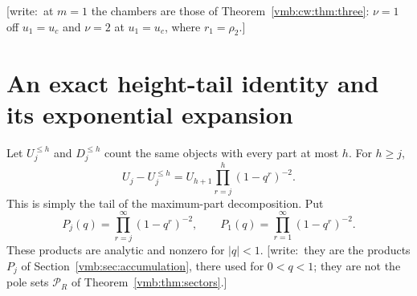 \documentclass[11pt,a4paper]{article}
\numberwithin{equation}{section}
\theoremstyle{definition}\newtheorem{definition}[theorem]{Definition}
\theoremstyle{remark}\newtheorem{remark}[theorem]{Remark}
\newcommand{\calP}{\mathcal P}
\newcommand{\wrt}[1]{\textup{[}\textsf{write:}~#1\textup{]}}
\begin{document}
\wrt{at $m=1$ the chambers are those of Theorem~\ref{vmb:cw:thm:three}:
$\nu=1$ off $u_1=u_c$ and $\nu=2$ at $u_1=u_c$, where $r_1=\rho_2$.}

\section{An exact height-tail identity and its exponential expansion}
\label{vmb:cw:sec:heighttail}
Let $U_j^{\le h}$ and $D_j^{\le h}$ count the same objects with every part
at most $h$. For $h\ge j$,
\begin{equation}\label{vmb:cw:eq:Utail}
 U_j-U_j^{\le h}=U_{h+1}\prod_{r=j}^{h}(1-q^r)^{-2}.
\end{equation}
This is simply the tail of the maximum-part decomposition.
Put
\begin{equation}\label{vmb:cw:eq:Pj}
 P_j(q)=\prod_{r=j}^{\infty}(1-q^r)^{-2},\qquad
 P_1(q)=\prod_{r=1}^{\infty}(1-q^r)^{-2}.
\end{equation}
These products are analytic and nonzero for $|q|<1$. \wrt{they are the
products $P_{j}$ of Section~\ref{vmb:sec:accumulation}, there used for
$0<q<1$; they are not the pole sets $\calP_R$ of
Theorem~\ref{vmb:thm:sectors}.}
\end{document}
